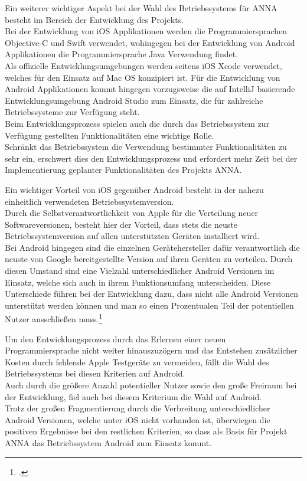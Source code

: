 Ein weiterer wichtiger Aspekt bei der Wahl des Betriebssystems für \ac{ANNA} besteht im Bereich der Entwicklung des Projekts.\\
Bei der Entwicklung von iOS Applikationen werden die Programmiersprachen Objective-C und Swift verwendet, wohingegen bei der Entwicklung von Android Applikationen die Programmiersprache Java Verwendung findet.\\
Als offizielle Entwicklungsumgebungen werden seitens iOS Xcode verwendet, welches für den Einsatz auf Mac OS konzipiert ist. Für die Entwicklung von Android Applikationen kommt hingegen vorzugsweise die auf IntelliJ basierende Entwicklungsumgebung Android Studio zum Einsatz, die für zahlreiche Betriebssysteme zur Verfügung steht.\\
Beim Entwicklungsprozess spielen auch die durch das Betriebssystem zur Verfügung gestellten Funktionalitäten eine wichtige Rolle.\\
Schränkt das Betriebssystem die Verwendung bestimmter Funktionalitäten zu sehr ein, erschwert dies den Entwicklungsprozess und erfordert mehr Zeit bei der Implementierung geplanter Funktionalitäten des Projekts \ac{ANNA}.

Ein wichtiger Vorteil von iOS gegenüber Android besteht in der nahezu einheitlich verwendeten Betriebssystemversion.\\
Durch die Selbstverantwortlichkeit von Apple für die Verteilung neuer Softwareversionen, besteht hier der Vorteil, dass stets die neuste Betriebssystemversion auf allen unterstützten Geräten installiert wird.\\
Bei Android hingegen sind die einzelnen Gerätehersteller dafür verantwortlich die neuste von Google bereitgestellte Version auf ihren Geräten zu verteilen. Durch diesen Umstand sind eine Vielzahl unterschiedlicher Android Versionen im Einsatz, welche sich auch in ihrem Funktionsumfang unterscheiden. Diese Unterschiede führen bei der Entwicklung dazu, dass nicht alle Android Versionen unterstützt werden können und man so einen Prozentualen Teil der potentiellen Nutzer ausschließen muss.\footcite[vgl.:][]{androidvsiosvergleich}

Um den Entwicklungsprozess durch das Erlernen einer neuen Programmiersprache nicht weiter hinauszuzögern und das Entstehen zusätzlicher Kosten durch fehlende Apple Testgeräte zu vermeiden, fällt die Wahl des Betriebssystems bei diesen Kriterien auf Android.\\
Auch durch die größere Anzahl potentieller Nutzer sowie den große Freiraum bei der Entwicklung, fiel auch bei diesem Kriterium die Wahl auf Android.\\
Trotz der großen Fragmentierung durch die Verbreitung unterschiedlicher Android Versionen, welche unter iOS nicht vorhanden ist, überwiegen die positiven Ergebnisse bei den restlichen Kriterien, so dass als Basis für Projekt \ac{ANNA} das Betriebssystem Android zum Einsatz kommt.

